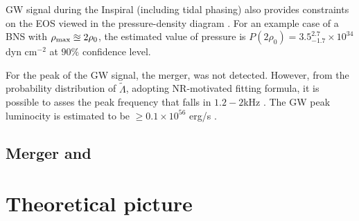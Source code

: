 \ac{GW} signal during the Inspiral (including tidal phasing) also provides constraints 
on the \ac{EOS} viewed in the pressure-density diagram \cite{65}. 
For an example case of a \ac{BNS} with $\rho_{\rm max} \approxeq 2 \rho_0$, 
the estimated value of pressure is $P(2\rho_0)=3.5_{-1.7}^{2.7}\times10^{34}$ dyn cm$^{-2}$ 
at $90\%$ confidence level.

For \GW{} the peak of the \ac{GW} signal, the merger, was not detected. However, from the 
probability distribution of $\tilde{\Lambda}$, adopting \ac{NR}-motivated fitting 
formula, it is possible to asses the peak frequency that falls in $1.2 - 2$kHz \cite{55}.
The \ac{GW} peak luminocity is estimated to be $\geq 0.1\times 10^{56}$ erg/s \cite{61}. 




\subsection{Merger and \pmerg{}}























































\section{Theoretical picture}

